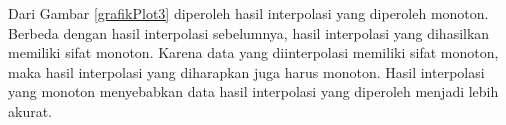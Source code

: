 Dari Gambar \ref{grafikPlot3} diperoleh hasil interpolasi yang diperoleh monoton. Berbeda dengan hasil interpolasi sebelumnya, hasil interpolasi yang dihasilkan memiliki sifat monoton. Karena data yang diinterpolasi memiliki sifat monoton, maka hasil interpolasi yang diharapkan juga harus monoton. Hasil interpolasi yang monoton menyebabkan data hasil interpolasi yang diperoleh menjadi lebih akurat.
